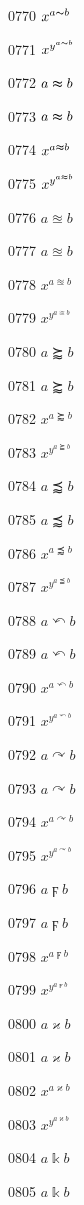 \documentclass{article}
\begin{document}
0770 $x^{a\thicksim b}$\par
0771 $x^{y^{a\thicksim b}}$\par
0772 $a\thickapprox b$\par
0773 $\displaystyle a\thickapprox b$\par
0774 $x^{a\thickapprox b}$\par
0775 $x^{y^{a\thickapprox b}}$\par
0776 $a\approxeq b$\par
0777 $\displaystyle a\approxeq b$\par
0778 $x^{a\approxeq b}$\par
0779 $x^{y^{a\approxeq b}}$\par
0780 $a\succapprox b$\par
0781 $\displaystyle a\succapprox b$\par
0782 $x^{a\succapprox b}$\par
0783 $x^{y^{a\succapprox b}}$\par
0784 $a\precapprox b$\par
0785 $\displaystyle a\precapprox b$\par
0786 $x^{a\precapprox b}$\par
0787 $x^{y^{a\precapprox b}}$\par
0788 $a\curvearrowleft b$\par
0789 $\displaystyle a\curvearrowleft b$\par
0790 $x^{a\curvearrowleft b}$\par
0791 $x^{y^{a\curvearrowleft b}}$\par
0792 $a\curvearrowright b$\par
0793 $\displaystyle a\curvearrowright b$\par
0794 $x^{a\curvearrowright b}$\par
0795 $x^{y^{a\curvearrowright b}}$\par
0796 $a\digamma b$\par
0797 $\displaystyle a\digamma b$\par
0798 $x^{a\digamma b}$\par
0799 $x^{y^{a\digamma b}}$\par
0800 $a\varkappa b$\par
0801 $\displaystyle a\varkappa b$\par
0802 $x^{a\varkappa b}$\par
0803 $x^{y^{a\varkappa b}}$\par
0804 $a\Bbbk b$\par
0805 $\displaystyle a\Bbbk b$\par
\end{document}
